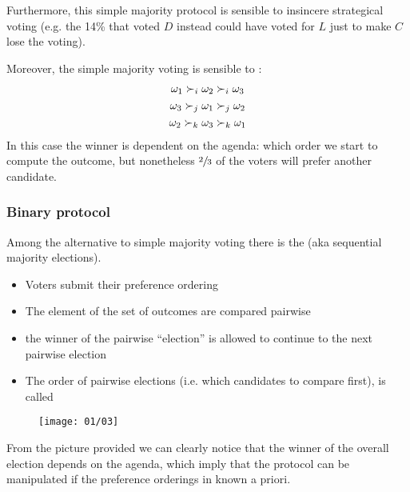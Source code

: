 Furthermore, this simple majority protocol is sensible to insincere strategical voting (e.g. the 14\% that voted $D$ instead could have voted for $L$ just to make $C$ lose the voting).

Moreover, the simple majority voting is sensible to :
\begin{gather*}
\omega_1 \succ_i \omega_2 \succ_i \omega_3\\
\omega_3 \succ_j \omega_1 \succ_j \omega_2\\
\omega_2 \succ_k \omega_3 \succ_k \omega_1\\
\end{gather*}
In this case the winner is dependent on the agenda: which order we start to compute the outcome, but nonetheless $\sfrac{2}{3}$ of the voters will prefer another candidate.

\subsubsection{Binary protocol}
Among the alternative to simple majority voting there is the  (aka sequential majority elections).

\begin{itemize}
\item Voters submit their preference ordering
\item The element of the set of outcomes are compared pairwise
\item the winner of the pairwise ``election'' is allowed to continue to the next pairwise election
\item The order of pairwise elections (i.e. which candidates to compare first), is called 
\end{itemize}

\begin{figure}[!h]
\centering
\texttt{[image: 01/03]}
\end{figure}


From the picture provided we can clearly notice that the winner of the overall election depends on the agenda, which imply that the protocol can be manipulated if the preference orderings in known a priori.


